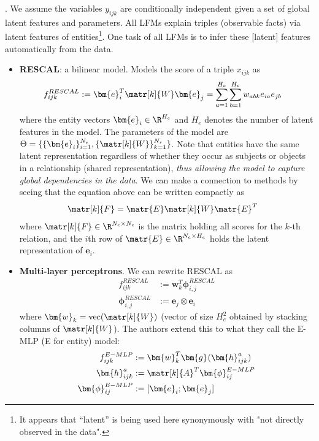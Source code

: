 \documentclass[11pt]{article}
\renewcommand\vec[2][]{\bm{#2}_{#1}}
\newcommand\myspace[1][]{\vspace{#1\bigskipamount}}
\newcommand\p{\Needspace{10\baselineskip} \noindent}
\begin{document}
\myspace
\p {}. We assume the variables $y_{ijk}$ are conditionally independent given a set of global latent features and parameters. All LFMs explain triples (observable facts) via latent features of entities\footnote{It appears that ``latent'' is being used here synonymously with "not directly observed in the data".}. One task of all LFMs is to infer these [latent] features automatically from the data.
\begin{itemize}
	\item \textbf{RESCAL}: a bilinear model. Models the score of a triple $x_{ijk}$ as 
	\begin{align}
		f_{ijk}^{RESCAL}
			&:= \vec[i]{e}^T \matr[k]{W} \vec[j]{e} = \sum_{a = 1}^{H_e} \sum_{b = 1}^{H_e} w_{abk} e_{ia} e_{jb}
	\end{align}
	where the entity vectors $\vec[i]{e} \in \R^{H_e}$ and $H_e$ denotes the number of latent features in the model. The parameters of the model are $\Theta = \{ \{  \vec[i]{e} \}_{i=1}^{N_e}, \{ \matr[k]{W} \}_{k = 1}^{N_r} \}$. Note that entities have the same latent representation regardless of whether they occur as subjects or objects in a relationship (shared representation), \textit{thus allowing the model to capture global dependencies in the data}. We can make a connection to  methods by seeing that the equation above can be written compactly as 
	\begin{align}
		\matr[k]{F} &= \matr{E} \matr[k]{W} \matr{E}^T
	\end{align}
	where $\matr[k]{F} \in \R^{N_e \times N_e}$ is the matrix holding all scores for the $k$-th relation, and the $i$th row of $\matr{E} \in \R^{N_e \times H_e}$ holds the latent representation of $\vec[i]{e}$.
	
	\item \textbf{Multi-layer perceptrons}. We can rewrite RESCAL as
	\begin{align}
		f_{ijk}^{RESCAL} &:= \vec[k]{w}^T \vec[i,j]{\phi}^{RESCAL} \\
		\vec[i,j]{\phi}^{RESCAL} &:= \vec[j]{e} \otimes \vec[i]{e}
	\end{align}
	where $\vec[k]{w} = \text{vec}(\matr[k]{W})$ (vector of size $H_e^2$ obtained by stacking columns of $\matr[k]{W}$). The authors extend this to what they call the E-MLP (E for entity) model:
	\begin{align}
		f_{ijk}^{E-MLP} &:= \vec[k]{w}^T \vec{g}(\vec[ijk]{h}^a) \\
		\vec[ijk]{h}^a &:= \matr[k]{A}^T \vec[ij]{\phi}^{E-MLP} \\
		\vec[ij]{\phi}^{E-MLP} &:= [\vec[i]{e}; \vec[j]{e}]
	\end{align}
\end{itemize}
\end{document}
